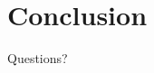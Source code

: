 \section{Conclusion}
%


\begin{frame}
	\begin{center}
		\Huge Questions?
	\end{center}
\end{frame}


